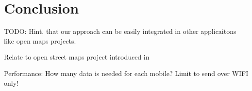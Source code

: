\chapter{Conclusion}\label{chapter:conclusion}

TODO: Hint, that our approach can be easily integrated in other applicaitons like open maps projects.

Relate to open street maps project introduced in \parencite{krumm}

Performance: How many data is needed for each mobile?
Limit to send over WIFI only!
